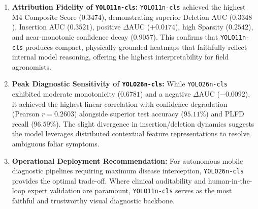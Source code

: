 \begin{enumerate}
    \item \textbf{Attribution Fidelity of \texttt{YOLO11n-cls}:} \texttt{YOLO11n-cls} achieved the highest M4 Composite Score ($0.3474$), demonstrating superior Deletion AUC ($0.3348$), Insertion AUC ($0.3521$), positive $\Delta\text{AUC}$ ($+0.0174$), high Sparsity ($0.2542$), and near-monotonic confidence decay ($0.9057$). This confirms that \texttt{YOLO11n-cls} produces compact, physically grounded heatmaps that faithfully reflect internal model reasoning, offering the highest interpretability for field agronomists.
    \item \textbf{Peak Diagnostic Sensitivity of \texttt{YOLO26n-cls}:} While \texttt{YOLO26n-cls} exhibited moderate monotonicity ($0.6781$) and a negative $\Delta\text{AUC}$ ($-0.0092$), it achieved the highest linear correlation with confidence degradation (Pearson $r = 0.2603$) alongside superior test accuracy ($95.11\%$) and PLFD recall ($96.59\%$). The slight divergence in insertion/deletion dynamics suggests the model leverages distributed contextual feature representations to resolve ambiguous foliar symptoms.
    \item \textbf{Operational Deployment Recommendation:} For autonomous mobile diagnostic pipelines requiring maximum disease interception, \texttt{YOLO26n-cls} provides the optimal trade-off. Where clinical auditability and human-in-the-loop expert validation are paramount, \texttt{YOLO11n-cls} serves as the most faithful and trustworthy visual diagnostic backbone.
\end{enumerate}

